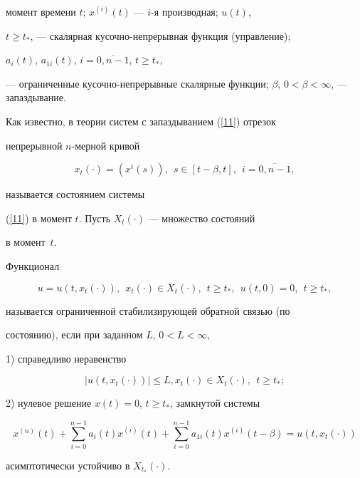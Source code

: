 момент времени $t$; $x^{(i)}(t)$ --- $i$-я производная; $u(t)$,


$t\ge t_*$, --- скалярная кусочно-непрерывная функция (управление);


$a_i(t)$, $a_{1i}(t)$, $i=\overline{0,n-1}$, $t \ge t_{*}$,


--- ограниченные кусочно-непрерывные скалярные функции; $\beta$, $0 < \beta


< \infty$, --- запаздывание.





Как известно, в теории систем с запаздыванием (\ref{11}) отрезок


непрерывной $n$-мерной кривой


$$


x_t(\cdot)=(x^{i}(s)),\ \ s \in


[t-\beta,t],\ \ i=\overline{0,n-1},


$$


называется состоянием системы


(\ref{11}) в момент $t$. Пусть $X_{t}(\cdot)$ --- множество состояний


в момент~$t$.





\begin{defns}


Функционал


\begin{equation}\label{12}


u=u(t,x_t(\cdot)),\ \ x_{t}(\cdot) \in X_t(\cdot),


\ \ t \ge t_*,\ \ u(t,0)=0,\ \ t \ge t_*,


\end{equation}


называется ограниченной стабилизирующей обратной связью (по


состоянию), если при заданном $L$, $0 < L < \infty$,





1) справедливо неравенство


\begin{equation}\label{13}


|u(t,x_t(\cdot))| \le L, x_t(\cdot) \in X_{t}(\cdot),\ \ t \ge t_*;


\end{equation}





2) нулевое решение $x(t)=0$, $t \ge t_*$, замкнутой системы


\begin{equation}\label{14}


x^{(n)}(t)+\sum_{i=0}^{n-1}a_i(t)x^{(i)}(t)+


\sum_{i=0}^{n-1}a_{1i}(t)x^{(i)}(t-\beta)=u(t,x_t(\cdot))


\end{equation}


асимптотически устойчиво в $X_{t_*}(\cdot)$.


\end{defns}





